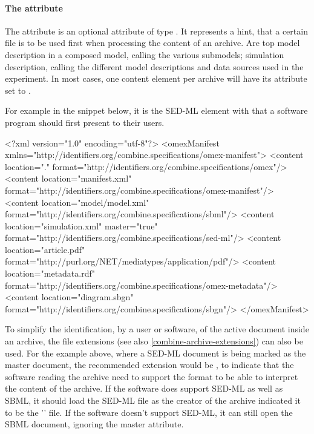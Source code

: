 \paragraph{The  attribute}
\label{active_document}
The  attribute is an optional attribute of type . It 
represents a hint, that a certain file is to be used first when 
processing the content of an archive. Are top model description in a 
composed model, calling the various submodels; simulation description, 
calling the different model descriptions and data sources used in the 
experiment. In most cases, one content element per archive will have its  
attribute set to .

For example in the snippet below, it is the 
SED-ML element with  that a software 
program should first present to their users.

\begin{example}
<?xml version="1.0" encoding="utf-8"?>
<omexManifest xmlns="http://identifiers.org/combine.specifications/omex-manifest">
    <content location="." format="http://identifiers.org/combine.specifications/omex"/>
    <content location="manifest.xml" 
        format="http://identifiers.org/combine.specifications/omex-manifest"/>
    <content location="model/model.xml" format="http://identifiers.org/combine.specifications/sbml"/>
    <content location="simulation.xml" master="true"
        format="http://identifiers.org/combine.specifications/sed-ml"/>
    <content location="article.pdf" format="http://purl.org/NET/mediatypes/application/pdf"/>
    <content location="metadata.rdf"
        format="http://identifiers.org/combine.specifications/omex-metadata"/>
    <content location="diagram.sbgn" format="http://identifiers.org/combine.specifications/sbgn"/>
</omexManifest>
\end{example}

To simplify the identification, by a user or software, of the active document inside an archive, the file extensions 
(see also \ref{combine-archive-extensions}) can also be used. For the example above, 
where a SED-ML document is being marked as the master document, the 
recommended extension would be , to indicate that the software reading the archive need
to support the  format to be able to interpret the content of the archive. If the software
does support SED-ML as well as SBML, it should load the SED-ML file as the creator of the archive indicated
it to be the '' file. If the software doesn't support SED-ML, it can still open the SBML document, ignoring
the master attribute.

